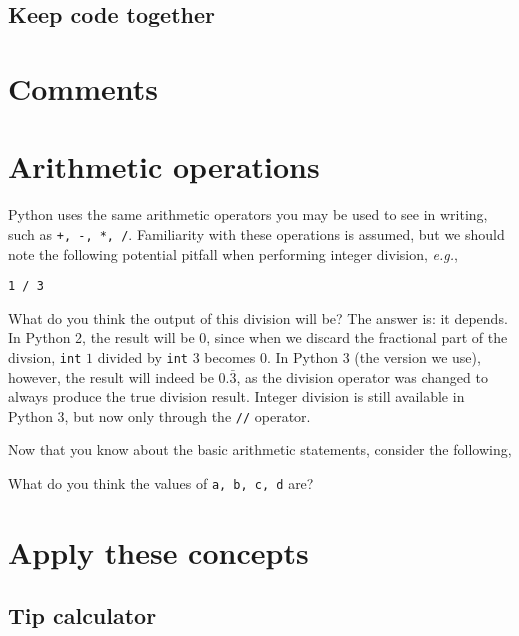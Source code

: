 		\subsection{Keep code together}
		
	\section{Comments}
	
	
	\section{Arithmetic operations}
	Python uses the same arithmetic operators you may be used to see in writing, such as \lstinline|+, -, *, /|. Familiarity with these operations is assumed, but we should note the following potential pitfall when performing integer division, \textit{e.g.},
	
	\lstinline|1 / 3|
	
	What do you think the output of this division will be? The answer is: it depends. In Python 2, the result will be $0$, since when we discard the fractional part of the divsion, \texttt{int} $1$ divided by \texttt{int} 3 becomes $0$. In Python 3 (the version we use), however, the result will indeed be $0.\bar{3}$, as the division operator was changed to always produce the true division result. Integer division is still available in Python 3, but now only through the \lstinline|//| operator.
	
	Now that you know about the basic arithmetic statements, consider the following,
	
	
	
	What do you think the values of \lstinline|a, b, c, d| are?
	
	
	
	\section{Apply these concepts}
	
	
		\subsection{Tip calculator}
	
		
		
		

